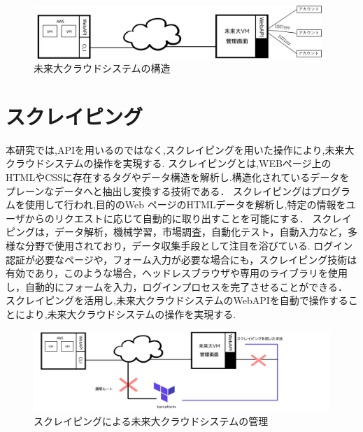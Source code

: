 \documentclass[11pt]{ujarticle}\sloppy
\begin{document}
\begin{figure}[h]
	\includegraphics[width=1\linewidth,height=2cm]{./images/cloud.png}
	\caption{未来大クラウドシステムの構造}
	\label{fig:cloud}
\end{figure}



\section{スクレイピング}


本研究では,APIを用いるのではなく,スクレイピングを用いた操作により,未来大クラウドシステムの操作を実現する.
スクレイピングとは,WEBページ上のHTMLやCSSに存在するタグやデータ構造を解析し.構造化されているデータをプレーンなデータへと抽出し変換する技術である．
スクレイピングはプログラムを使用して行われ,目的のWeb ページのHTMLデータを解析し,特定の情報をユーザからのリクエストに応じて自動的に取り出すことを可能にする．
スクレイピングは，データ解析，機械学習，市場調査，自動化テスト，自動入力など，多様な分野で使用されており，データ収集手段として注目を浴びている.
ログイン認証が必要なページや，フォーム入力が必要な場合にも，スクレイピング技術は有効であり，このような場合，ヘッドレスブラウザや専用のライブラリを使用し，自動的にフォームを入力，ログインプロセスを完了させることができる．
スクレイピングを活用し,未来大クラウドシステムのWebAPIを自動で操作することにより,未来大クラウドシステムの操作を実現する.


\begin{figure}[h]
	\includegraphics[width=1\linewidth]{./images/scraping.png}
	\caption{スクレイピングによる未来大クラウドシステムの管理}
  \label{fig:scraping}
\end{figure}


%
%
\end{document}
